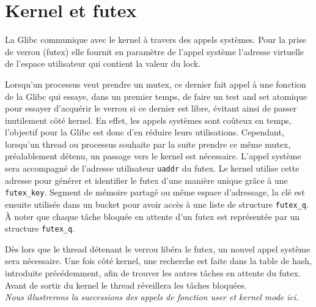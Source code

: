 \section*{Kernel et futex}
La Glibc communique avec le kernel à travers des appels systèmes. Pour la prise de verrou (futex) elle fournit en paramètre de l'appel système l'adresse virtuelle de l'espace utilisateur qui contient la valeur du lock.

Lorsqu'un processus veut prendre un mutex, ce dernier fait appel à une fonction 
de la Glibc qui essaye, dans un premier temps, de faire un test and set atomique pour essayer d'acquérir le verrou si ce dernier est libre, évitant ainsi de passer inutilement côté kernel. En effet, les appels systèmes sont coûteux en temps, l'objectif pour la Glibc est donc d'en réduire leurs utilisations. Cependant, lorsqu'un thread ou processus souhaite par la suite prendre ce même mutex, préalablement détenu, un passage vers le kernel est nécessaire. L'appel système sera accompagné de l'adresse utilisateur \verb|uaddr| du futex. Le kernel utilise cette adresse pour générer et identifier le futex d'une manière unique grâce à une \verb|futex_key|. Segment de mémoire partagé ou même espace d'adressage, la clé est ensuite utilisée dans un bucket pour avoir accès à une liste de structure \verb|futex_q|. À noter que chaque tâche bloquée en attente d'un futex est représentée par un structure \verb|futex_q|.

Dès lors que le thread détenant le verrou libéra le futex, un nouvel appel système sera nécessaire. Une fois côté kernel, une recherche est faite dans la table de hash, introduite précédemment, afin de trouver les autres tâches en attente du futex. Avant de sortir du kernel le thread réveillera les tâches bloquées.
\\

\textit{Nous illustrerons la successions des appels de fonction user et kernel mode ici.}
